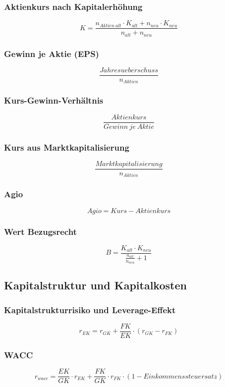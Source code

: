 \subsubsection{Aktienkurs nach Kapitalerhöhung}
\[K = \frac{n_{Aktien~alt} \cdot K_{alt} + n_{neu} \cdot K_{neu}}{n_{alt} + n_{neu}}\]

\subsubsection{Gewinn je Aktie (EPS)}
\[\frac{Jahresueberschuss}{n_{Aktien}}\]

\subsubsection{Kurs-Gewinn-Verhältnis}
\[\frac{Aktienkurs}{Gewinn~je~Aktie}\]

\subsubsection{Kurs aus Marktkapitalisierung}
\[\frac{Marktkapitalisierung}{n_{Aktien}}\]

\subsubsection{Agio}
\[Agio = Kurs - Aktienkurs\]

\subsubsection{Wert Bezugsrecht}
\[B = \frac{K_{alt} \cdot K_{neu}}{\frac{n_{alt}}{n_{neu}}+1}\]


\subsection{Kapitalstruktur und Kapitalkosten}

\subsubsection{Kapitalstrukturrisiko und Leverage-Effekt}
\[r_{EK} = r_{GK} + \frac{FK}{EK} \cdot (r_{GK} - r_{FK})\]

\subsubsection{WACC}
\[r_{wacc} = \frac{EK}{GK} \cdot r_{EK} + \frac{FK}{GK} \cdot r_{FK} \cdot (1-Einkommenssteuersatz)\]

